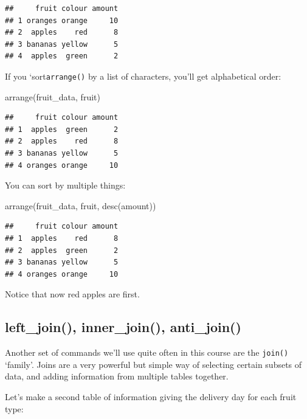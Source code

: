 \documentclass[
]{book}
\newenvironment{Shaded}{\begin{snugshade}}{\end{snugshade}}
\newcommand{\FunctionTok}[1]{\textcolor[rgb]{0.00,0.00,0.00}{#1}}
\newcommand{\NormalTok}[1]{#1}
\begin{document}
\begin{verbatim}
##     fruit colour amount
## 1 oranges orange     10
## 2  apples    red      8
## 3 bananas yellow      5
## 4  apples  green      2
\end{verbatim}

If you `sort\texttt{arrange()} by a list of characters, you'll get alphabetical order:

\begin{Shaded}
\begin{Highlighting}[]
\FunctionTok{arrange}\NormalTok{(fruit\_data, fruit)}
\end{Highlighting}
\end{Shaded}

\begin{verbatim}
##     fruit colour amount
## 1  apples  green      2
## 2  apples    red      8
## 3 bananas yellow      5
## 4 oranges orange     10
\end{verbatim}

You can sort by multiple things:

\begin{Shaded}
\begin{Highlighting}[]
\FunctionTok{arrange}\NormalTok{(fruit\_data, fruit, }\FunctionTok{desc}\NormalTok{(amount))}
\end{Highlighting}
\end{Shaded}

\begin{verbatim}
##     fruit colour amount
## 1  apples    red      8
## 2  apples  green      2
## 3 bananas yellow      5
## 4 oranges orange     10
\end{verbatim}

Notice that now red apples are first.

\hypertarget{left_join-inner_join-anti_join}{%
\subsection{left\_join(), inner\_join(), anti\_join()}\label{left_join-inner_join-anti_join}}

Another set of commands we'll use quite often in this course are the \texttt{join()} `family'. Joins are a very powerful but simple way of selecting certain subsets of data, and adding information from multiple tables together.

Let's make a second table of information giving the delivery day for each fruit type:
\end{document}
